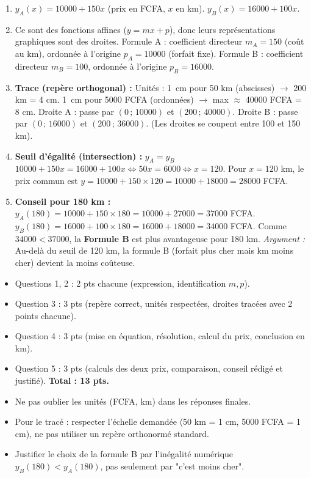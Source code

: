 \documentclass[11pt]{article}
\begin{document}
\begin{corrige}
\begin{enumerate}
\item $y_A(x) = 10000 + 150x$ \quad (prix en FCFA, $x$ en km).
$y_B(x) = 16000 + 100x$.
\item Ce sont des fonctions affines ($y = mx + p$), donc leurs représentations graphiques sont des droites.
Formule A : coefficient directeur $m_A = 150$ (coût au km), ordonnée à l'origine $p_A = 10000$ (forfait fixe).
Formule B : coefficient directeur $m_B = 100$, ordonnée à l'origine $p_B = 16000$.
\item \textbf{Trace (repère orthogonal) :}
Unités : \SI{1}{cm} pour 50 km (abscisses) $\rightarrow$ 200 km = 4 cm.
\SI{1}{cm} pour \num{5000} FCFA (ordonnées) $\rightarrow$ max $\approx$ \num{40000} FCFA = 8 cm.
Droite A : passe par $(0\,;\,10000)$ et $(200\,;\,40000)$.
Droite B : passe par $(0\,;\,16000)$ et $(200\,;\,36000)$.
(Les droites se coupent entre 100 et 150 km).
\item \textbf{Seuil d'égalité (intersection) :} $y_A = y_B$
$10000 + 150x = 16000 + 100x \iff 50x = 6000 \iff x = 120$.
Pour $x = 120$ km, le prix commun est $y = 10000 + 150 \times 120 = 10000 + 18000 = \num{28000}$ FCFA.
\item \textbf{Conseil pour 180 km :}
$y_A(180) = 10000 + 150 \times 180 = 10000 + 27000 = \num{37000}$ FCFA.
$y_B(180) = 16000 + 100 \times 180 = 16000 + 18000 = \num{34000}$ FCFA.
Comme $34000 < 37000$, la \textbf{Formule B} est plus avantageuse pour 180 km.
\textit{Argument :} Au-delà du seuil de 120 km, la formule B (forfait plus cher mais km moins cher) devient la moins coûteuse.
\end{enumerate}
\end{corrige}
\begin{aretenir}
\begin{itemize}
\item Questions 1, 2 : 2 pts chacune (expression, identification $m,p$).
\item Question 3 : 3 pts (repère correct, unités respectées, droites tracées avec 2 points chacune).
\item Question 4 : 3 pts (mise en équation, résolution, calcul du prix, conclusion en km).
\item Question 5 : 3 pts (calculs des deux prix, comparaison, conseil rédigé et justifié).
\textbf{Total : 13 pts.}
\end{itemize}
\end{aretenir}
\begin{attention}
\begin{itemize}
\item Ne pas oublier les unités (FCFA, km) dans les réponses finales.
\item Pour le tracé : respecter l'échelle demandée (50 km = 1 cm, 5000 FCFA = 1 cm), ne pas utiliser un repère orthonormé standard.
\item Justifier le choix de la formule B par l'inégalité numérique $y_B(180) < y_A(180)$, pas seulement par "c'est moins cher".
\end{itemize}
\end{attention}
\end{document}

